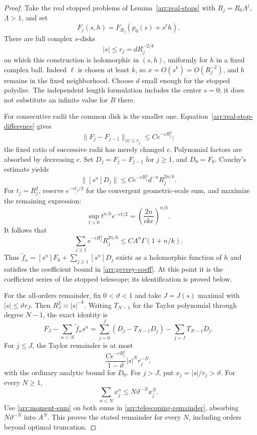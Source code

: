\begin{proof}
Take the real stopped problems of Lemma~\ref{arr:real-stops} with
\(R_j=R_0\Lambda^j\), \(\Lambda>1\), and set
\[
 F_j(s,h)=F_{R_j}(p_0(s)+s^\ell h).
\]
There are full complex \(s\)-disks
\[
 |s|\le r_j=dR_j^{-2/k}
\]
on which this construction is holomorphic in \((s,h)\), uniformly
for $h$ in a fixed complex ball.  Indeed $\ell$ is chosen at least $k$,
so \(x=O(s^k)=O(R_j^{-2})\), and $b$ remains in the fixed neighborhood.
Choose $d$ small enough for the stopped polydisc.  The independent
length formulation includes the center $s=0$; it does not substitute an
infinite value for $B$ there.

For consecutive radii the common disk is the smaller one.
Equation~\eqref{arr:real-stop-difference} gives
\[
 \|F_j-F_{j-1}\|_{|s|\le r_j}\le C e^{-cR_j^2};
\]
the fixed ratio of successive radii has merely changed \(c\).
Polynomial factors are absorbed by decreasing \(c\).
Set \(D_j=F_j-F_{j-1}\) for \(j\ge1\), and \(D_0=F_0\).
Cauchy's estimate yields
\[
 \|[s^n]D_j\|
 \le C e^{-cR_j^2}d^{-n}R_j^{2n/k}.
\]
For \(t_j=R_j^2\), reserve \(e^{-ct_j/2}\) for the convergent
geometric-scale sum, and maximize the remaining expression:
\[
 \sup_{t>0}t^{n/k}e^{-ct/2}
    =\left(\frac{2n}{cke}\right)^{n/k}.
\]
It follows that
\begin{equation}\label{arr:moment-sum}
 \sum_{j\ge1}e^{-cR_j^2}R_j^{2n/k}
       \le C A^n\Gamma(1+n/k).
\end{equation}
Thus
\(\widetilde f_n=[s^n]F_0+\sum_{j\ge1}[s^n]D_j\)
exists as a holomorphic function of $h$ and satisfies the coefficient
bound in \eqref{arr:gevrey-coeff}.  At this point it is the coefficient
series of the stopped telescope; its identification is proved below.

For the all-orders remainder, fix \(0<\vartheta<1\) and take
\(J=J(s)\) maximal with \(|s|\le\vartheta r_J\).
Then \(R_J^2\asymp |s|^{-k}\).
Writing \(T_{N-1}\) for the Taylor polynomial through degree
\(N-1\), the exact identity is
\begin{equation}\label{arr:telescoping-remainder}
 F_J-\sum_{n<N}\widetilde f_ns^n
 =\sum_{j=0}^J(D_j-T_{N-1}D_j)
       -\sum_{j>J}T_{N-1}D_j .
\end{equation}
For \(j\le J\), the Taylor remainder is at most
\[
 \frac{C e^{-cR_j^2}}{1-\vartheta}
       |s|^N r_j^{-N},
\]
with the ordinary analytic bound for \(D_0\).
For \(j>J\), put \(x_j=|s|/r_j>\vartheta\).
For every \(N\ge1\),
\[
 \sum_{n<N}x_j^n\le N\vartheta^{-N}x_j^N.
\]
Use \eqref{arr:moment-sum} on both sums in
\eqref{arr:telescoping-remainder}, absorbing
\(N\vartheta^{-N}\) into \(A^N\).  This proves the stated
remainder for every \(N\), including orders beyond optimal
truncation.


\end{proof}
